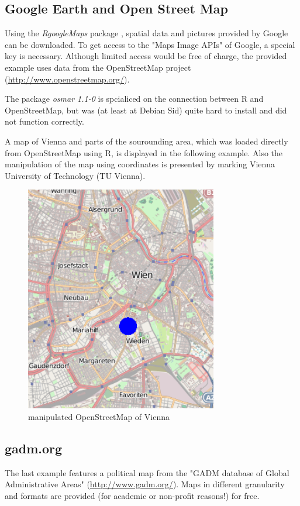\documentclass{ifacconf}
\begin{document}
\subsection{Google Earth and Open Street Map}
Using the \textit{RgoogleMaps} package \citep{RgoogleMaps}, spatial data and
pictures provided by Google can be downloaded. To get access to the 
"Maps Image APIs" of Google, a special key is necessary. Although limited access would be free
of charge, the provided example uses data from the OpenStreetMap project 
(\url{http://www.openstreetmap.org/}).

The package \textit{osmar 1.1-0} is spcialiced on the connection
between R and OpenStreetMap, but was (at least at Debian Sid) quite hard to install
and did not function correctly.

A map of Vienna and parts of the sourounding area, which was loaded directly
from OpenStreetMap using R, is displayed in the following example. 
Also the manipulation of the map using coordinates is presented by marking
Vienna University of Technology (TU Vienna).


\begin{figure}[h]
\begin{center}
\includegraphics[width=8.4cm]{pics/hometu.png}    %
\caption{manipulated OpenStreetMap of Vienna} 
\label{fig:hometu}
\end{center}
\end{figure}


\subsection{gadm.org}
The last example features a political map from 
the "GADM database of Global Administrative Areas" (\url{http://www.gadm.org/}).
Maps in different granularity and formats are provided (for academic or
non-profit reasons!) for free.
\end{document}
